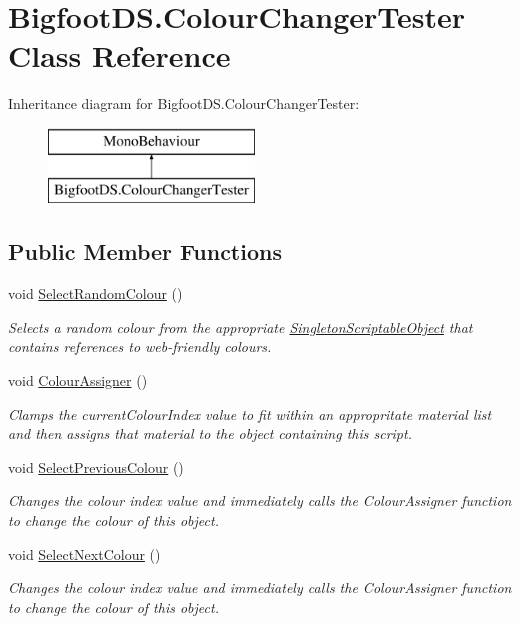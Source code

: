 \hypertarget{class_bigfoot_d_s_1_1_colour_changer_tester}{}\section{Bigfoot\+D\+S.\+Colour\+Changer\+Tester Class Reference}
\label{class_bigfoot_d_s_1_1_colour_changer_tester}
Inheritance diagram for Bigfoot\+D\+S.\+Colour\+Changer\+Tester\+:\begin{figure}[H]
\begin{center}
\leavevmode
\includegraphics[height=2.000000cm]{class_bigfoot_d_s_1_1_colour_changer_tester}
\end{center}
\end{figure}
\subsection*{Public Member Functions}
\begin{DoxyCompactItemize}
\item 
void \mbox{\hyperlink{class_bigfoot_d_s_1_1_colour_changer_tester_a062a15842af6c9e67840e8827ea345ee}{Select\+Random\+Colour}} ()
\begin{DoxyCompactList}\small\item\em Selects a random colour from the appropriate \mbox{\hyperlink{class_singleton_scriptable_object}{Singleton\+Scriptable\+Object}} that contains references to web-\/friendly colours. \end{DoxyCompactList}\item 
void \mbox{\hyperlink{class_bigfoot_d_s_1_1_colour_changer_tester_a723b8d8bcccfccd194319e4ea608e821}{Colour\+Assigner}} ()
\begin{DoxyCompactList}\small\item\em Clamps the current\+Colour\+Index value to fit within an appropritate material list and then assigns that material to the object containing this script. \end{DoxyCompactList}\item 
void \mbox{\hyperlink{class_bigfoot_d_s_1_1_colour_changer_tester_af15ff93daa349ad267667db3f88f18c3}{Select\+Previous\+Colour}} ()
\begin{DoxyCompactList}\small\item\em Changes the colour index value and immediately calls the Colour\+Assigner function to change the colour of this object. \end{DoxyCompactList}\item 
void \mbox{\hyperlink{class_bigfoot_d_s_1_1_colour_changer_tester_ae480b9548f5407a651999676d1724da2}{Select\+Next\+Colour}} ()
\begin{DoxyCompactList}\small\item\em Changes the colour index value and immediately calls the Colour\+Assigner function to change the colour of this object. \end{DoxyCompactList}\end{DoxyCompactItemize}
